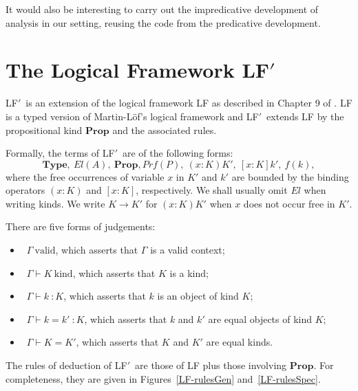 \documentclass[acmtocl]{acmtrans2m}
\newcommand{\vald}{\ \mathrm{valid}}
\newcommand{\Type}{\mathbf{Type}}
\newcommand{\Prop}{\mathbf{Prop}}
\newcommand{\Prf}[1]{Prf \left( {#1} \right)}
\newcommand{\kind}{\ \mathrm{kind}}
\newcommand{\LF}{LF$'$}
\begin{document}
It would also be interesting to
carry out the impredicative development of analysis in our setting,
reusing the code from the predicative development.



\appendix
\section{The Logical Framework \LF}
\label{appendix:lf}

\LF\ is an extension of the logical framework LF as described in
Chapter 9 of \cite{luo:car}.  LF is a typed version of
Martin-L\"{o}f's logical framework and \LF\ extends LF by the
propositional kind $\Prop$ and the associated rules.

Formally, the terms of \LF\ are of the following forms:
\[ \Type,\ El(A),\ \Prop, \Prf{P},\ (x:K)K',\ [x:K]k',\ f(k), \]
where the free occurrences of variable $x$ in $K'$ and $k'$ are
bounded by the binding operators $(x:K)$ and $[x:K]$, respectively.  We shall usually omit $El$ when writing kinds.  We write $K \rightarrow K'$ for $(x:K)K'$ when $x$ does not occur free in $K'$.
\pagebreak

There are five forms of judgements:
\begin{itemize}
\item \ $\Gamma \vald$, which asserts that $\Gamma$ is a valid context;
\item
\ $\Gamma \vdash K \kind$, which asserts that $K$ is a kind;
\item
\ $\Gamma \vdash k\ \colon K$, which asserts that $k$ is an object
of kind $K$;
\item
\ $\Gamma \vdash k=k'\ \colon K$, which asserts that $k$ and $k'$
are equal objects of kind $K$;
\item
\ $\Gamma \vdash K=K'$, which asserts that $K$ and $K'$ are equal
kinds.
\end{itemize}
The rules of deduction of \LF\ are those of LF \cite{luo:car} plus
those involving $\Prop$.  For completeness, they are given in
Figures~\ref{LF-rulesGen} and~\ref{LF-rulesSpec}.
\end{document}
